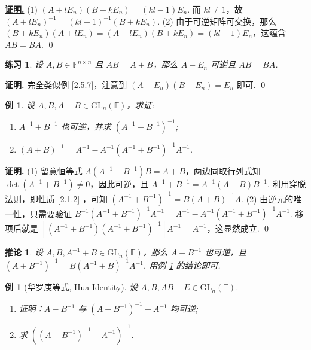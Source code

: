 \documentclass[10pt,openany]{article}
\theoremstyle{thmstyle} %
\newtheorem{practice}{练习}[section]
\theoremstyle{defstyle} %
\newtheorem{corollary}[theorem]{推论}
\theoremstyle{prostyle} %
\theoremstyle{exastyle}
\newtheorem{example}[theorem]{例}
\theoremstyle{remstyle}
\renewenvironment{proof}[1][证明]{\par\underline{\textbf{#1.}} \;\fangsong}{\qed\par}
\newcommand{\F}{\mathbb{F}}
\newcommand{\gfn}{\text{GL}_n(\mathbb{F})}
\newcommand{\n}{^{n \times n}}
\begin{document}
\begin{proof}
	(1) \( (A+lE_n)(B+kE_n)=(kl-1)E_n \). 而 \( kl \neq 1 \)，故 \( (A+lE_n)^{-1}=(kl-1)^{-1}(B+kE_n) \). (2) 由于可逆矩阵可交换，那么 \( (B+kE_n)(A+lE_n)=(A+lE_n)(B+kE_n)=(kl-1)E_n \)，这蕴含 \( AB=BA \).
\end{proof}

\begin{practice}
	设 \( A,B \in \F\n \) 且 \( AB=A+B \)，那么 \( A-E_n \) 可逆且 \( AB=BA \). 
\end{practice}

\begin{proof}
	完全类似例 \ref{2.5.7}，注意到 \( (A-E_n)(B-E_n)=E_n \) 即可.
\end{proof}

\begin{example} \label{2.5.8}
	设 \( A,B, A+B \in \gfn \)，求证:
	\begin{enumerate}[(1)]
		\item \( A^{-1}+B^{-1} \) 也可逆，并求 \( (A^{-1}+B^{-1})^{-1} \);
		\item \( (A+B)^{-1}=A^{-1}-A^{-1}(A^{-1}+B^{-1})^{-1} A^{-1} \).
	\end{enumerate}
\end{example}

\begin{proof}
	(1) 留意恒等式 \( A(A^{-1}+B^{-1})B=A+B \)，两边同取行列式知 \( \det (A^{-1}+B^{-1}) \neq 0 \)，因此可逆，且 \( A^{-1}+B^{-1}=A^{-1}(A+B)B^{-1} \). 利用穿脱法则，即性质 \ref{2.1.2} ，可知 \( (A^{-1}+B^{-1})^{-1}=B(A+B)^{-1}A \). (2) 由逆元的唯一性，只需要验证 \( B^{-1}(A^{-1}+B^{-1})^{-1}A^{-1}=A^{-1}-A^{-1}(A^{-1}+B^{-1})^{-1} A^{-1} \). 移项后就是 \( [(A^{-1}+B^{-1})(A^{-1}+B^{-1})^{-1}]A^{-1}=A^{-1} \)，这显然成立.
\end{proof}

\begin{corollary}
	设 \( A,B, A^{-1}+B \in \gfn \)，那么 \( A+B^{-1} \) 也可逆，且 \( (A+B^{-1})^{-1}=B(A^{-1}+B)^{-1}A^{-1} \). 用例 \ref{2.5.8} 的结论即可.
\end{corollary}

\begin{example}[华罗庚等式, Hua Identity]
	设 \( A, B, AB - E \in \gfn \).
	\begin{enumerate}[(1)]
		\item 证明：\( A - B^{-1} \) 与 \( (A - B^{-1})^{-1} - A^{-1} \) 均可逆;
		\item 求 \( \left( (A - B^{-1})^{-1} - A^{-1} \right)^{-1} \).
	\end{enumerate}
\end{example}
\end{document}
